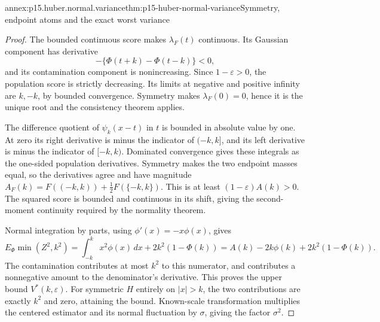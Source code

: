 \begin{annexitem}{annex:p15.huber.normal.variance}{thm:p15-huber-normal-variance}{Symmetry, endpoint atoms and the exact worst variance}
\begin{proof}
The bounded continuous score makes \(\lambda_F(t)\) continuous.
Its Gaussian component has derivative
\[
 -\{\Phi(t+k)-\Phi(t-k)\}<0,
\]
and its contamination component is nonincreasing.
Since \(1-\varepsilon>0\), the population score is strictly decreasing.
Its limits at negative and positive infinity are \(k,-k\), by
bounded convergence. Symmetry makes \(\lambda_F(0)=0\), hence it
is the unique root and the consistency theorem applies.

The difference quotient of \(\psi_k(x-t)\) in \(t\) is bounded
in absolute value by one. At zero its right derivative is minus
the indicator of \((-k,k]\), and its left derivative is minus
the indicator of \([-k,k)\). Dominated convergence gives these
integrals as the one-sided population derivatives.
Symmetry makes the two endpoint masses equal, so the derivatives
agree and have magnitude
\(A_F(k)=F((-k,k))+\tfrac12F(\{-k,k\})\).
This is at least \((1-\varepsilon)A(k)>0\).
The squared score is bounded and continuous in its shift, giving
the second-moment continuity required by the normality theorem.

Normal integration by parts, using \(\phi'(x)=-x\phi(x)\), gives
\[
 E_\Phi\min(Z^2,k^2)
 =\int_{-k}^k x^2\phi(x)\,dx+2k^2(1-\Phi(k))
 =A(k)-2k\phi(k)+2k^2(1-\Phi(k)).
\]
The contamination contributes at most \(k^2\) to this numerator,
and contributes a nonnegative amount to the denominator's derivative.
This proves the upper bound \(V^*(k,\varepsilon)\).
For symmetric \(H\) entirely on \(|x|>k\), the two contributions
are exactly \(k^2\) and zero, attaining the bound.
Known-scale transformation multiplies the centered estimator and
its normal fluctuation by \(\sigma\), giving the factor \(\sigma^2\).
\end{proof}
\end{annexitem}

